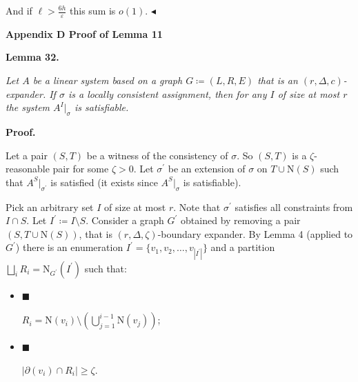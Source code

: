 And if $\ell>\frac{6h}{\varepsilon}$ this sum is $o(1)$.
$\blacktriangleleft$\par






\par\medskip\noindent\textbf{
Appendix D Proof of Lemma 11
}\par





\par\medskip\noindent\textbf{
\textbf{Lemma 32}\textbf{.}
}\par



\emph{Let $A$ be a linear system based on a graph $G\coloneqq(L,R,E)$ that is an $(r,\Delta,c)$-expander. If $\sigma$ is a locally consistent assignment, then for any $I$ of size at most $r$
the system $A^{I}|_{\sigma}$ is satisfiable.}\par






\par\medskip\noindent\textbf{Proof.}\par




Let a pair $(S,T)$ be a witness of the consistency of $\sigma$. So $(S,T)$ is a $\zeta$-reasonable
pair for some $\zeta>0$. Let $\sigma^{\prime}$ be an extension of $\sigma$ on $T\cup\mathrm{N}\left(S\right)$ such that
$A^{S}|_{\sigma^{\prime}}$ is satisfied (it exists since $A^{S}|_{\sigma}$ is satisfiable).\par




Pick an arbitrary set $I$ of size at most $r$. Note that $\sigma^{\prime}$ satisfies all constraints from $I\cap S$. Let $I^{\prime}\coloneqq I\setminus S$. Consider a graph $G^{\prime}$ obtained by removing a pair $(S,T\cup\mathrm{N}\left(S\right))$, that is $(r,\Delta,\zeta)$-boundary expander. By Lemma 4
(applied to $G^{\prime}$) there is an enumeration $I^{\prime}=\{v_{1},v_{2},\dots,v_{|I^{\prime}|}\}$ and a
partition $\bigsqcup\limits_{i}R_{i}=\mathrm{N}_{G^{\prime}}\left(I^{\prime}\right)$ such that:\par


\begin{itemize}


\item[] 
$\blacksquare$ 


$R_{i}=\mathrm{N}\left(v_{i}\right)\setminus\left(\bigcup\limits_{j=1}^{i-1}%
\mathrm{N}\left(v_{j}\right)\right)$;\par





\item[] 
$\blacksquare$ 


$|\partial(v_{i})\cap R_{i}|\geq\zeta$.\par





\end{itemize}


